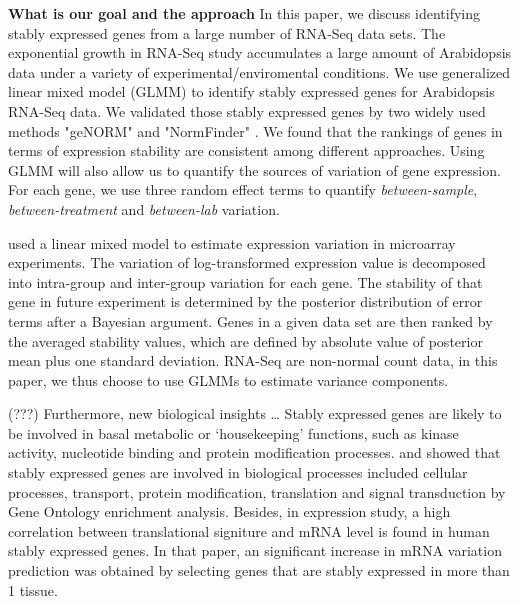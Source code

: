 \documentclass[11pt, a4paper]{article}
\begin{document}
\textbf{What is our goal and the approach} 
In this paper, we discuss identifying stably expressed genes from a large
number of RNA-Seq data sets.
The exponential growth in RNA-Seq study accumulates a large amount of
Arabidopsis data under a variety of experimental/enviromental conditions. We
use generalized linear mixed model (GLMM) \citep{mccullagh1989generalized} to
identify stably expressed genes for Arabidopsis RNA-Seq data. We validated
those stably expressed genes by two widely used methods  "geNORM"
\citep{vandesompele2002accurate} and  "NormFinder"
\citep{andersen2004normalization}. We found that the rankings of genes in
terms of expression stability are consistent among different approaches. Using
GLMM will also allow us to quantify the sources of variation of gene
expression.  For each gene, we use three random effect terms to quantify
\textit{between-sample}, \textit{between-treatment} and \textit{between-lab}
variation. 

\cite{andersen2004normalization} used a linear mixed model to estimate
expression variation in microarray experiments. The variation of
log-transformed expression value is decomposed into intra-group and
inter-group variation for each gene. The stability of that gene in future
experiment is determined by the posterior distribution of error terms after a
Bayesian argument. Genes in a given data set are then ranked by the averaged
stability values, which are defined by absolute value of posterior mean plus
one standard deviation. 
RNA-Seq are non-normal count data, in this paper, we thus choose to use GLMMs to
estimate variance components.

(???) Furthermore, new biological insights \dots
Stably expressed genes are likely to be involved in basal metabolic or ‘housekeeping’ functions, such as  kinase activity, nucleotide binding and protein modification processes.
\cite{sekhon2011genome} and \cite{wang2010dynamic} showed that stably expressed genes are involved in biological processes included cellular processes, transport, protein modification, translation and signal transduction by Gene Ontology enrichment analysis. Besides, in expression
study, a high correlation between translational signiture and mRNA level is
found in human stably expressed genes\citep{line2013translational}. In that
paper, an significant increase in mRNA variation prediction was obtained by
selecting genes that are stably expressed in more than 1 tissue.\\
\end{document}
